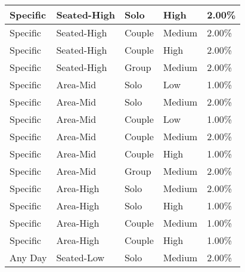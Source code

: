 \begin{longtable}{|l|l|l|l|l|}
    \hline
    Specific                 & Seated-High              & Solo               & High                 & 2.00\%              \\
    \hline
    Specific                 & Seated-High              & Couple             & Medium               & 2.00\%              \\
    \hline
    Specific                 & Seated-High              & Couple             & High                 & 2.00\%              \\
    \hline
    Specific                 & Seated-High              & Group              & Medium               & 2.00\%              \\
    \hline
    Specific                 & Area-Mid                 & Solo               & Low                  & 1.00\%              \\
    \hline
    Specific                 & Area-Mid                 & Solo               & Medium               & 2.00\%              \\
    \hline
    Specific                 & Area-Mid                 & Couple             & Low                  & 1.00\%              \\
    \hline
    Specific                 & Area-Mid                 & Couple             & Medium               & 2.00\%              \\
    \hline
    Specific                 & Area-Mid                 & Couple             & High                 & 1.00\%              \\
    \hline
    Specific                 & Area-Mid                 & Group              & Medium               & 2.00\%              \\
    \hline
    Specific                 & Area-High                & Solo               & Medium               & 2.00\%              \\
    \hline
    Specific                 & Area-High                & Solo               & High                 & 1.00\%              \\
    \hline
    Specific                 & Area-High                & Couple             & Medium               & 1.00\%              \\
    \hline
    Specific                 & Area-High                & Couple             & High                 & 1.00\%              \\
    \hline
    Any Day                  & Seated-Low               & Solo               & Medium               & 2.00\%              \\

\end{longtable}
